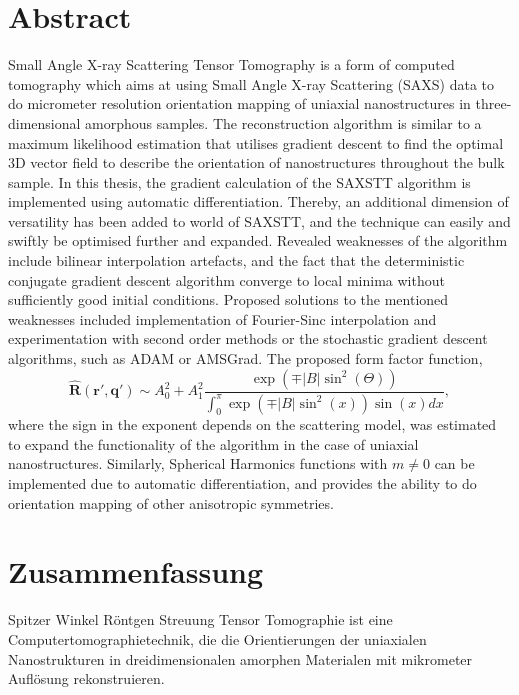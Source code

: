 


\begingroup
\let\clearpage\relax
\let\cleardoublepage\relax
\let\cleardoublepage\relax

\chapter*{Abstract}

Small Angle X-ray Scattering Tensor Tomography is a form of computed tomography
which aims at using Small Angle X-ray Scattering (SAXS) data to do micrometer resolution orientation mapping
of uniaxial nanostructures in three-dimensional amorphous samples.
The reconstruction algorithm is similar to a maximum likelihood estimation that utilises gradient descent to find the optimal 3D vector field
to describe the orientation of nanostructures throughout the bulk sample.
In this thesis, the gradient calculation of the SAXSTT algorithm is implemented using automatic differentiation.
Thereby, an additional dimension of versatility has been added to world of SAXSTT, and the technique can easily and swiftly be optimised further and expanded.
Revealed weaknesses of the algorithm include bilinear interpolation artefacts,
and the fact that the deterministic conjugate gradient descent algorithm converge to local minima without sufficiently good initial conditions.
Proposed solutions to the mentioned weaknesses included implementation of Fourier-Sinc interpolation and experimentation with second order methods or the stochastic gradient descent algorithms, such as ADAM or AMSGrad.
The proposed form factor function,
\begin{equation*}
    \bm{\widehat{R}}(\bm{r'}, \bm{q'}) \sim A_{0}^{2} + A_{1}^{2}\frac{ \exp\left(\mp |B| \sin^2(\Theta) \right) } {\int_{0}^{\pi} \exp\left( \mp |B| \sin^{2}(x) \right) \sin(x) dx},
\end{equation*}
where the sign in the exponent depends on the scattering model, was estimated to expand the functionality of the algorithm in the case of uniaxial nanostructures.
Similarly, Spherical Harmonics functions with $m \neq 0$ can be implemented due to automatic differentiation,
and provides the ability to do orientation mapping of other anisotropic symmetries.

\clearpage
\chapter*{Zusammenfassung}
Spitzer Winkel Röntgen Streuung Tensor Tomographie ist eine Computertomographietechnik,
die die Orientierungen der uniaxialen Nanostrukturen in dreidimensionalen amorphen Materialen mit mikrometer Auflösung rekonstruieren.

\endgroup

\vfill

